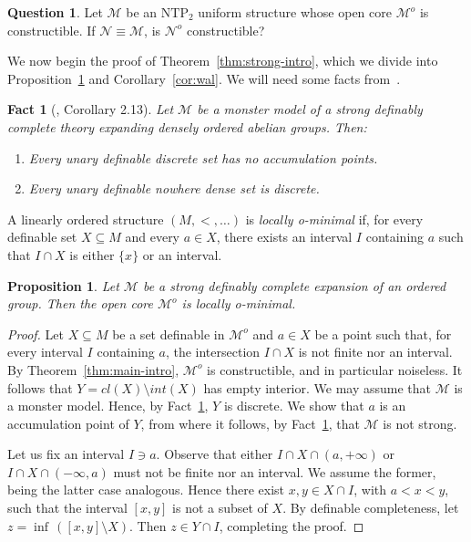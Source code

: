 \documentclass[12pt]{article}
\newcommand{\Mm}{\mathcal{M}}
\newcommand{\Nn}{\mathcal{N}}
\newcommand{\NTP}{\ensuremath{\mathrm{NTP}_2}}
\newcommand{\Mo}{\Mm^o}%
\newcommand{\No}{\Nn^o}
\newtheorem{proposition}[theorem]{Proposition}
\newtheorem{fact}[theorem]{Fact}
\theoremstyle{definition}
\newtheorem{question}[theorem]{Question}
\theoremstyle{remark}
\begin{document}
\begin{question}
Let $\Mm$ be an $\NTP$ uniform structure whose open core $\Mo$ is constructible. If $\Nn\equiv \Mm$, is $\No$ constructible? 
\end{question}

We now begin the proof of Theorem~\ref{thm:strong-intro}, which we divide into Proposition~\ref{prop:local-o-min} and Corollary~\ref{cor:wal}. We will need some facts from~\cite{DG17, Wal22}. 

\begin{fact}[\cite{DG17}, Corollary 2.13] \label{fct:DG-acc-point}
Let $\Mm$ be a monster model of a strong definably complete theory expanding densely ordered abelian groups. Then:
\begin{enumerate}
    \item Every unary definable discrete set has no accumulation points. 
    \item Every unary definable nowhere dense set is discrete. 
\end{enumerate}
\end{fact}

A linearly ordered structure $(M,<,\ldots)$ is \emph{locally o-minimal} if, for every definable set $X\subseteq M$ and every $a\in X$, there exists an interval $I$ containing $a$ such that $I\cap X$ is either $\{x\}$ or an interval. 

\begin{proposition}\label{prop:local-o-min}
Let $\Mm$ be a strong definably complete expansion of an ordered group. Then the open core $\Mo$ is locally o-minimal.
\end{proposition}
\begin{proof} 
Let $X\subseteq M$ be a set definable in $\Mo$ and $a\in X$ be a point such that, for every interval $I$ containing $a$, the intersection $I\cap X$ is not finite nor an interval. By Theorem~\ref{thm:main-intro}, $\Mo$ is constructible, and in particular noiseless. It follows that $Y=cl(X)\setminus int(X)$ has empty interior. We may assume that $\Mm$ is a monster model. Hence, by Fact~\ref{fct:DG-acc-point}, $Y$ is discrete. We show that $a$ is an accumulation point of $Y$, from where it follows, by Fact~\ref{fct:DG-acc-point}, that $\Mm$ is not strong.

Let us fix an interval $I\ni a$. Observe that either $I \cap X \cap (a,+\infty)$ or $I \cap X \cap (-\infty, a)$ must not be finite nor an interval. We assume the former, being the latter case analogous. Hence there exist $x, y\in X\cap I$, with $a<x<y$, such that the interval $[x,y]$ is not a subset of $X$. By definable completeness, let $z =\inf \, \left( [x,y]\setminus X \right)$. Then $z \in Y \cap I$, completing the proof.         
\end{proof}
\end{document}

